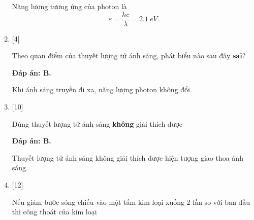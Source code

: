 \begin{enumerate}[label=\bfseries Câu \arabic*:]
{		Năng lượng tương ứng của photon là
		$$
		\varepsilon = \dfrac{hc}{\lambda} = \SI{2,1}{eV}.
		$$
	}
	
	\item {} [4]
	\cauhoi
	{Theo quan điểm của thuyết lượng tử ánh sáng, phát biểu nào sau đây \textbf{sai}?
	}
	
	\loigiai
	{		\textbf{Đáp án: B.}
		
		Khi ánh sáng truyền đi xa, năng lượng photon không đổi.
	}
	
	\item {} [10]
	\cauhoi
	{Dùng thuyết lượng tử ánh sáng\textbf{ không} giải thích được
		
	}
	
	\loigiai
	{		\textbf{Đáp án: B.}
		
		Thuyết lượng tử ánh sáng không giải thích được hiện tượng giao thoa ánh sáng.
	}
	
	\item {} [12]
	\cauhoi
	{Nếu giảm bước sóng chiếu vào một tấm kim loại xuống 2 lần so với ban đầu thì công thoát của kim loại  
		
	}
	

\end{enumerate}
